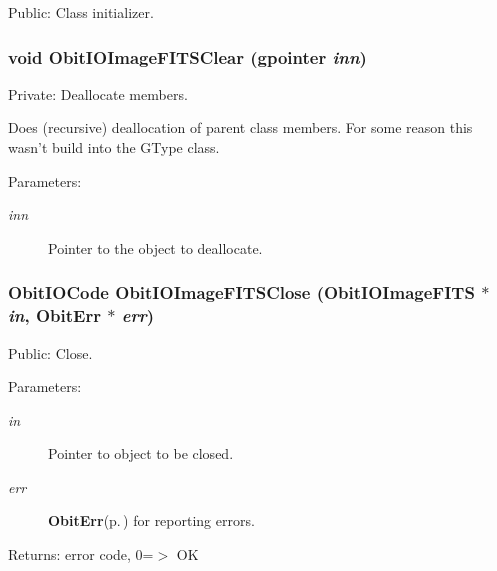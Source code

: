 Public: Class initializer. 

\subsubsection{\setlength{\rightskip}{0pt plus 5cm}void Obit\-IOImage\-FITSClear (gpointer {\em inn})}\label{ObitIOImageFITS_8c_a4}


Private: Deallocate members. 

Does (recursive) deallocation of parent class members. For some reason this wasn't build into the GType class. \begin{Desc}
\item[Parameters:]
\begin{description}
\item[{\em inn}]Pointer to the object to deallocate. \end{description}
\end{Desc}
\subsubsection{\setlength{\rightskip}{0pt plus 5cm}Obit\-IOCode Obit\-IOImage\-FITSClose ({\bf Obit\-IOImage\-FITS} $\ast$ {\em in}, {\bf Obit\-Err} $\ast$ {\em err})}\label{ObitIOImageFITS_8c_a26}


Public: Close. 

\begin{Desc}
\item[Parameters:]
\begin{description}
\item[{\em in}]Pointer to object to be closed. \item[{\em err}]{\bf Obit\-Err}{\rm (p.\,\pageref{structObitErr})} for reporting errors. \end{description}
\end{Desc}
\begin{Desc}
\item[Returns:]error code, 0=$>$ OK \end{Desc}
